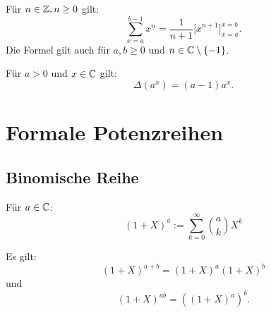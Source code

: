 Für $n\in\mathbb Z,n\ge 0$ gilt:
\begin{equation}
\sum_{x=a}^{b-1} x^{\underline n} = \frac{1}{n+1}\big[x^{\underline{n+1}}\big]_{x=a}^{x=b}.
\end{equation}
Die Formel gilt auch für $a,b\ge 0$ und $n\in\mathbb C\setminus\{-1\}$.

Für $a>0$ und $x\in\mathbb C$ gilt:
\begin{equation}
\Delta(a^x) = (a-1)a^x.
\end{equation}

\section{Formale Potenzreihen}
\subsection{Binomische Reihe}
\begin{Definition}
Für $a\in\mathbb C$:
\begin{equation}
(1+X)^a := \sum_{k=0}^\infty \binom{a}{k} X^k
\end{equation}
\end{Definition}
\noindent
Es gilt:
\begin{equation}
(1+X)^{a+b} = (1+X)^a (1+X)^b 
\end{equation}
und
\begin{equation}
(1+X)^{ab} = ((1+X)^a)^b.
\end{equation}

